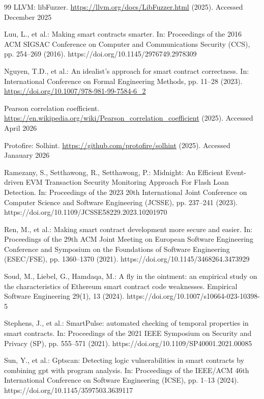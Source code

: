 \documentclass[pdflatex,sn-basic]{sn-jnl}%
\theoremstyle{thmstyleone}%
\theoremstyle{thmstyletwo}%
\theoremstyle{thmstylethree}%
\begin{document}
\begin{thebibliography}{99}
LLVM: libFuzzer. \url{https://llvm.org/docs/LibFuzzer.html} (2025). Accessed December 2025

Luu, L., et al.: Making smart contracts smarter. In: Proceedings of the 2016 ACM SIGSAC Conference on Computer and Communications Security (CCS), pp. 254--269 (2016). https://doi.org/10.1145/2976749.2978309

Nguyen, T.D., et al.: An idealist's approach for smart contract correctness. In: International Conference on Formal Engineering Methods, pp. 11--28 (2023). \url{https://doi.org/10.1007/978-981-99-7584-6_2}

Pearson correlation coefficient. \url{https://en.wikipedia.org/wiki/Pearson_correlation_coefficient} (2025). Accessed April 2026

Protofire: Solhint. \url{https://github.com/protofire/solhint} (2025). Accessed Janauary 2026

Ramezany, S., Setthawong, R., Setthawong, P.: Midnight: An Efficient Event-driven EVM Transaction Security Monitoring Approach For Flash Loan Detection. In: Proceedings of the 2023 20th International Joint Conference on Computer Science and Software Engineering (JCSSE), pp. 237--241 (2023). https://doi.org/10.1109/JCSSE58229.2023.10201970

Ren, M., et al.: Making smart contract development more secure and easier. In: Proceedings of the 29th ACM Joint Meeting on European Software Engineering Conference and Symposium on the Foundations of Software Engineering (ESEC/FSE), pp. 1360--1370 (2021). https://doi.org/10.1145/3468264.3473929

Soud, M., Liebel, G., Hamdaqa, M.: A fly in the ointment: an empirical study on the characteristics of Ethereum smart contract code weaknesses. Empirical Software Engineering 29(1), 13 (2024). https://doi.org/10.1007/s10664-023-10398-5

Stephens, J., et al.: SmartPulse: automated checking of temporal properties in smart contracts. In: Proceedings of the 2021 IEEE Symposium on Security and Privacy (SP), pp. 555--571 (2021). https://doi.org/10.1109/SP40001.2021.00085

Sun, Y., et al.: Gptscan: Detecting logic vulnerabilities in smart contracts by combining gpt with program analysis. In: Proceedings of the IEEE/ACM 46th International Conference on Software Engineering (ICSE), pp. 1--13 (2024). https://doi.org/10.1145/3597503.3639117


\end{thebibliography}
\end{document}
